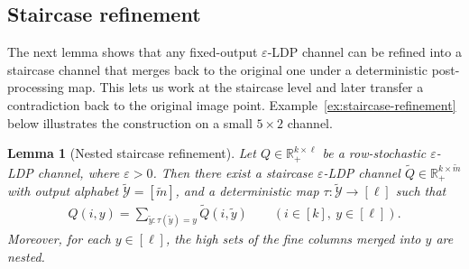 \documentclass{article}
\theoremstyle{plain}
\newtheorem{lemma}[theorem]{Lemma}
\theoremstyle{definition}
\theoremstyle{plain}
\begin{document}
\subsection{Staircase refinement}
\label{sec:staircase-refinement}
The next lemma shows that any fixed-output $\varepsilon$-LDP channel can be refined into a staircase channel that merges back to the original one under a deterministic post-processing map. This lets us work at the staircase level and later transfer a contradiction back to the original image point. Example~\ref{ex:staircase-refinement} below illustrates the construction on a small $5\times 2$ channel.
\begin{lemma}[Nested staircase refinement]
\label{lem:nested-staircase-refinement}
Let $Q\in\mathbb{R}_+^{k\times \ell}$ be a row-stochastic $\varepsilon$-LDP channel, where $\varepsilon>0$. Then there exist a staircase $\varepsilon$-LDP channel $\widetilde Q\in\mathbb{R}_+^{k\times \widetilde m}$ with output alphabet $\widetilde{\mathcal Y}=[\widetilde m]$, and a deterministic map $\tau:\widetilde{\mathcal Y}\to[\ell]$ such that
\begin{align*}
    Q(i,y)=\sum_{\tilde y:\tau(\tilde y)=y}\widetilde Q(i,\tilde y)
    \qquad (i\in[k],\ y\in[\ell]).
\end{align*}
Moreover, for each $y\in[\ell]$, the high sets of the fine columns merged into $y$ are nested.
\end{lemma}
\end{document}
